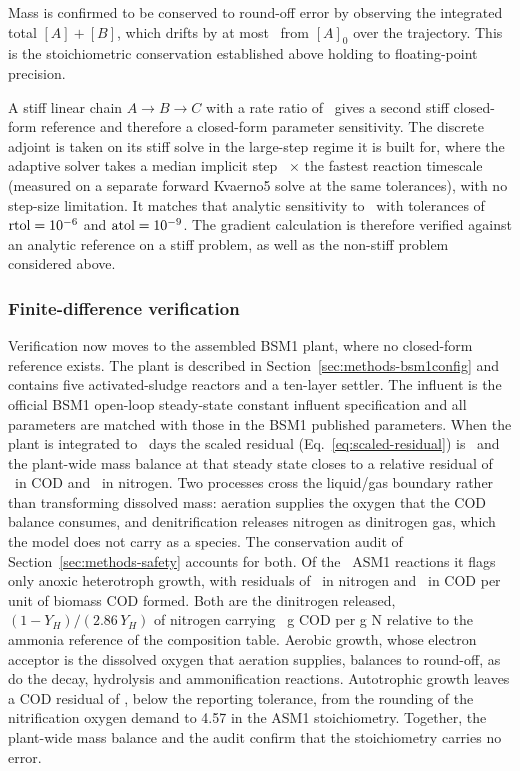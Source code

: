 \documentclass{article}
\begin{document}
Mass is confirmed to be conserved to round-off error by observing the integrated total \([A]+[B]\), which drifts by at most \VerifConsTotalMax\ from \([A]_0\) over the trajectory. This is the stoichiometric conservation established above holding to floating-point precision.

A stiff linear chain \(A\rightarrow B\rightarrow C\) with a rate ratio of \VerifStiffRatio\ gives a second stiff closed-form reference and therefore a closed-form parameter sensitivity. The discrete adjoint is taken on its stiff solve in the large-step regime it is built for, where the adaptive solver takes a median implicit step \VerifStiffStepRatio\ $\times$ the fastest reaction timescale (measured on a separate forward Kvaerno5 solve at the same tolerances), with no step-size limitation. It matches that analytic sensitivity to \VerifStiffGradRel\ with tolerances of \(\mathrm{rtol}=10^{-6}\) and \(\mathrm{atol}=10^{-9}\). The gradient calculation is therefore verified against an analytic reference on a stiff problem, as well as the non-stiff problem considered above.

\subsubsection{Finite-difference verification}
\label{sec:results-verification-fd}

Verification now moves to the assembled BSM1 plant, where no closed-form reference exists. The plant is described in Section~\ref{sec:methods-bsm1config} and contains five activated-sludge reactors and a ten-layer settler. The influent is the official BSM1 open-loop steady-state constant influent specification and all parameters are matched with those in the BSM1 published parameters. When the plant is integrated to \VerifADFDHorizon\ days the scaled residual (Eq.~\eqref{eq:scaled-residual}) is \VerifADFDHorizonResid\ and the plant-wide mass balance at that steady state closes to a relative residual of \VerifMassBalCOD\ in COD and \VerifMassBalN\ in nitrogen. Two processes cross the liquid/gas boundary rather than transforming dissolved mass: aeration supplies the oxygen that the COD balance consumes, and denitrification releases nitrogen as dinitrogen gas, which the model does not carry as a species. The conservation audit of Section~\ref{sec:methods-safety} accounts for both. Of the \ConsNreactions\ ASM1 reactions it flags only anoxic heterotroph growth, with residuals of \ConsResidN\ in nitrogen and \ConsResidCOD\ in COD per unit of biomass COD formed. Both are the dinitrogen released, \((1-Y_H)/(2.86\,Y_H)\) of nitrogen carrying \ConsNtwoCODperN~g COD per g N relative to the ammonia reference of the composition table. Aerobic growth, whose electron acceptor is the dissolved oxygen that aeration supplies, balances to round-off, as do the decay, hydrolysis and ammonification reactions. Autotrophic growth leaves a COD residual of \ConsAutoResidCOD, below the reporting tolerance, from the rounding of the nitrification oxygen demand to 4.57 in the ASM1 stoichiometry. Together, the plant-wide mass balance and the audit confirm that the stoichiometry carries no error.
\end{document}
